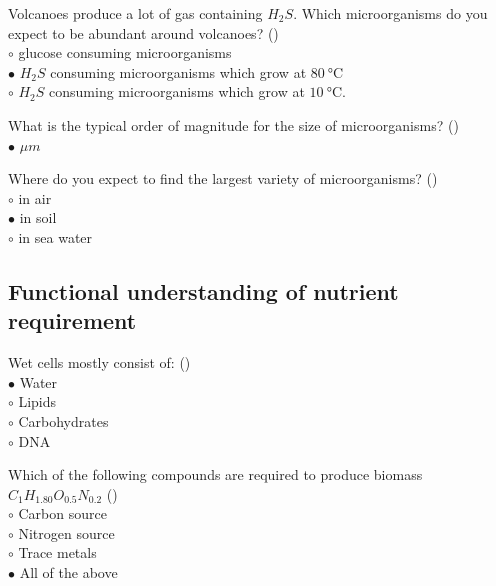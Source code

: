 \documentclass[]{beamer}
\begin{document}
\begin{frame}[shrink] {}
\addtocounter{answers}{1}
\color{blue}
Volcanoes produce a lot of gas containing $H_2S$. Which microorganisms do
you expect to be abundant around volcanoes? ()\\
\color{black}
\setlength{\parindent}{-0.4cm}
{\color{red}$\circ$} glucose consuming microorganisms\\
{\color{red}$\bullet$} $H_2S$ consuming microorganisms which grow at $\SI{80}{\degreeCelsius}$\\
{\color{red}$\circ$} $H_2S$ consuming microorganisms which grow at $\SI{10}{\degreeCelsius}$. 
\end{frame}
\begin{frame}[shrink] {}
\addtocounter{answers}{1}
\color{blue}
What is the typical order of magnitude for the size of microorganisms? ()\\
\color{black}
\setlength{\parindent}{-0.4cm}
{\color{red}$\bullet$} ${\mu}m$
\end{frame}
\begin{frame}[shrink] {}
\addtocounter{answers}{1}
\color{blue}
Where do you expect to find the largest variety of microorganisms? ()\\
\color{black}
\setlength{\parindent}{-0.4cm}
{\color{red}$\circ$} in air\\
{\color{red}$\bullet$} in soil\\
{\color{red}$\circ$} in sea water\\
\end{frame}
\subsection{Functional understanding of nutrient requirement}
\setcounter{answers}{0}
\begin{frame}[shrink] {}
\addtocounter{answers}{1}
\color{blue}
Wet cells mostly consist of: ()\\
\color{black}
\setlength{\parindent}{-0.4cm}
{\color{red}$\bullet$} Water\\ 
{\color{red}$\circ$} Lipids\\
{\color{red}$\circ$} Carbohydrates\\
{\color{red}$\circ$} DNA \\
\end{frame}
\begin{frame}[shrink] {}
\addtocounter{answers}{1}
\color{blue}
Which of the following compounds are required to produce biomass $C_1H_{1.80}O_{0.5}N_{0.2}$ ()\\
\color{black}
\setlength{\parindent}{-0.4cm}
{\color{red}$\circ$}  Carbon source\\
{\color{red}$\circ$} Nitrogen source\\
{\color{red}$\circ$} Trace metals\\
{\color{red}$\bullet$} All of the above \\
\end{frame}
\end{document}

